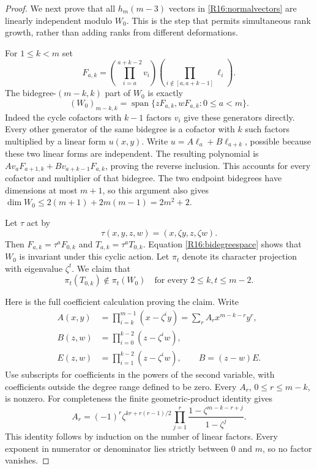 \documentclass[11pt,a4paper]{article}
\theoremstyle{definition}\newtheorem{definition}{Definition}
\begin{document}
\begin{proof}
We next prove that all $h_m(m-3)$ vectors in
\eqref{R16:normalvectors} are linearly independent modulo
$W_0$. This is the step that permits simultaneous rank growth,
rather than adding ranks from different deformations.

For $1\leq k<m$ set
\[
 F_{a,k}
   =\left(\prod_{i=a}^{a+k-2}v_i\right)
     \left(\prod_{i\notin[a,a+k-1]}\ell_i\right).
\]
The bidegree-$(m-k,k)$ part of $W_0$ is exactly
\begin{equation}\label{R16:bidegreespace}
 (W_0)_{m-k,k}
   =\operatorname{span}\{zF_{a,k},wF_{a,k}:0\leq a<m\}.
\end{equation}
Indeed the cycle cofactors with $k-1$ factors $v_i$ give
these generators directly. Every other generator of the
same bidegree is a cofactor with $k$ such factors multiplied
by a linear form $u(x,y)$. Write
$u=A\ell_a+B\ell_{a+k}$, possible because these two
linear forms are independent. The resulting polynomial is
$A v_aF_{a+1,k}+B v_{a+k-1}F_{a,k}$, proving the reverse
inclusion. This accounts for every cofactor and multiplier
of that bidegree. The two endpoint bidegrees have dimensions
at most $m+1$, so this argument also gives
$\dim W_0\leq2(m+1)+2m(m-1)=2m^2+2$.

Let $\tau$ act by
\[
 \tau(x,y,z,w)=(x,\zeta y,z,\zeta w).
\]
Then $F_{a,k}=\tau^aF_{0,k}$ and
$T_{a,k}=\tau^aT_{0,k}$. Equation
\eqref{R16:bidegreespace} shows that $W_0$ is invariant
under this cyclic action. Let $\pi_t$ denote its character
projection with eigenvalue $\zeta^t$.
We claim that
\begin{equation}\label{R16:allmodes}
 \pi_t(T_{0,k})\notin\pi_t(W_0)
 \quad\text{for every }2\leq k,t\leq m-2.
\end{equation}

Here is the full coefficient calculation proving the claim.
Write
\[
 \begin{aligned}
 A(x,y)&=\prod_{i=k}^{m-1}(x-\zeta^iy)
       =\sum_r A_r x^{m-k-r}y^r,\\
 B(z,w)&=\prod_{i=0}^{k-2}(z-\zeta^iw),\\
 E(z,w)&=\prod_{i=1}^{k-2}(z-\zeta^iw),\qquad B=(z-w)E.
 \end{aligned}
\]
Use subscripts for coefficients in the powers of the second
variable, with coefficients outside the degree range defined
to be zero. Every $A_r$, $0\leq r\leq m-k$, is nonzero.
For completeness the finite geometric-product identity gives
\[
 A_r=(-1)^r\zeta^{kr+r(r-1)/2}
      \prod_{j=1}^{r}
       \frac{1-\zeta^{m-k-r+j}}{1-\zeta^j}.
\]
This identity follows by induction on the number of linear
factors. Every exponent in numerator or denominator lies
strictly between $0$ and $m$, so no factor vanishes.


\end{proof}
\end{document}

